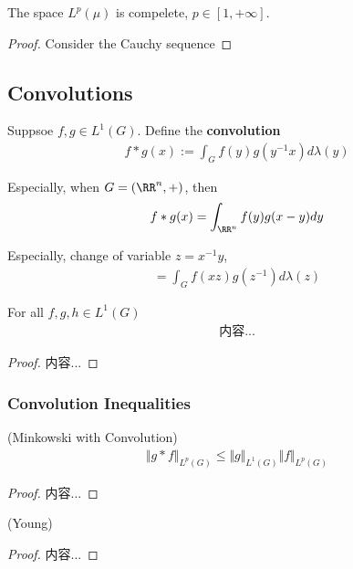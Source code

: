 \documentclass[Total.tex]{subfiles}
\begin{document}
	\begin{theorem}
		The space $L^p(\mu)$ is compelete, $p\in [1,+\infty]$. 
	\end{theorem}
	\begin{proof}
		Consider the Cauchy sequence 
	\end{proof}
	\subsection{Convolutions}
		\begin{Def}
			Suppsoe $f,g\in L^1(G)$. Define the \textbf{convolution}
			\begin{gather*}
				f*g(x):=\int_G f(y)g(y^{-1}x)d\lambda(y)
			\end{gather*}
			
			Especially, when $G=(\RR^n,+)$, then
			\begin{gather*}
				f*g(x)=\int_{\RR^n} f(y)g(x-y)dy
			\end{gather*}
		\end{Def}
		
		Especially, change of variable $z=x^{-1}y$,
		\begin{gather*}
			=\int_G f(xz)g(z^{-1})d\lambda(z)
		\end{gather*}
		
		\begin{proposition}
			For all $f,g,h\in L^1(G)$
			\begin{gather*}
				内容...
			\end{gather*}
		\end{proposition}
		\begin{proof}
			内容...
		\end{proof}
		
		
		\subsubsection{Convolution Inequalities}
			\begin{theorem}
				(Minkowski with Convolution)
				\begin{gather*}
					\Vert g* f\Vert_{L^p(G)}\leq \Vert g\Vert_{L^1(G)}\Vert f\Vert_{L^p(G)}
				\end{gather*}
			\end{theorem}
			\begin{proof}
				内容...
			\end{proof}
			
			\begin{theorem}
				(Young)
			\end{theorem}
			\begin{proof}
				内容...
			\end{proof}
			
\end{document}
